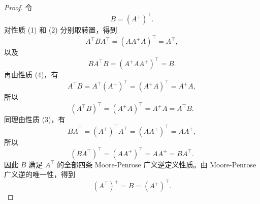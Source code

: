 \begin{proof}
    令
    \[
        B = \left(A^+\right)^\top.
    \]
    对性质 (1) 和 (2) 分别取转置，得到
    \[
        A^\top B A^\top
        = \left(AA^+A\right)^\top
        = A^\top,
    \]
    以及
    \[
        B A^\top B
        = \left(A^+AA^+\right)^\top
        = B.
    \]
    再由性质 (4)，有
    \[
        A^\top B
        = A^\top\left(A^+\right)^\top
        = \left(A^+A\right)^\top
        = A^+A,
    \]
    所以
    \[
        \left(A^\top B\right)^\top
        = \left(A^+A\right)^\top
        = A^+A
        = A^\top B.
    \]
    同理由性质 (3)，有
    \[
        BA^\top
        = \left(A^+\right)^\top A^\top
        = \left(AA^+\right)^\top
        = AA^+,
    \]
    所以
    \[
        \left(BA^\top\right)^\top
        = \left(AA^+\right)^\top
        = AA^+
        = BA^\top.
    \]
    因此 $B$ 满足 $A^\top$ 的全部四条 Moore-Penrose 广义逆定义性质。由 Moore-Penrose 广义逆的唯一性，得到
    \[
        \boxed{\left(A^\top\right)^+ = B = \left(A^+\right)^\top}.
    \]
\end{proof}
